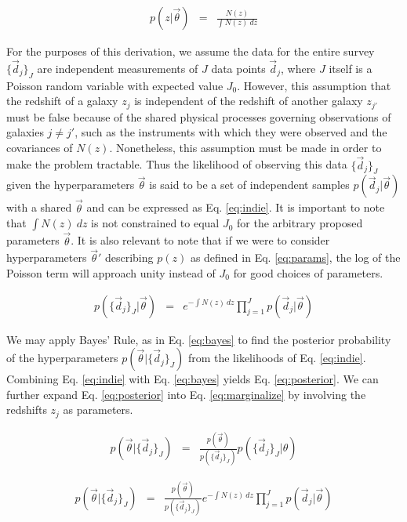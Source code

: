 \documentclass[preprint]{aastex}
\begin{document}
\begin{eqnarray}
\label{eq:params}
p(z|\vec{\theta}) &=& \frac{N(z)}{\int N(z)\ dz}
\end{eqnarray}

For the purposes of this derivation, we assume the data for the entire survey $\{\vec{d}_{j}\}_{J}$ are independent measurements of $J$ data points $\vec{d}_{j}$, where $J$ itself is a Poisson random variable with expected value $J_{0}$.  However, this assumption that the redshift of a galaxy $z_{j}$ is independent of the redshift of another galaxy $z_{j'}$ must be false because of the shared physical processes governing observations of galaxies $j\neq j'$, such as the instruments with which they were observed and the covariances of $N(z)$.  Nonetheless, this assumption must be made in order to make the problem tractable.  Thus the likelihood of observing this data $\{\vec{d}_{j}\}_{J}$ given the hyperparameters $\vec{\theta}$ is said to be a set of independent samples $p(\vec{d}_{j}|\vec{\theta})$ with a shared $\vec{\theta}$ and can be expressed as Eq. \ref{eq:indie}.  \citep{for14}  It is important to note that $\int N(z)\ dz$ is not constrained to equal $J_{0}$ for the arbitrary proposed parameters $\vec{\theta}$.  It is also relevant to note that if we were to consider hyperparameters $\vec{\theta}'$ describing $p(z)$ as defined in Eq. \ref{eq:params}, the log of the Poisson term will approach unity instead of $J_{0}$ for good choices of parameters.

\begin{eqnarray}
\label{eq:indie}
p(\{\vec{d}_{j}\}_{J}|\vec{\theta}) &=& e^{-\int N(z)\ dz}\prod_{j=1}^{J}p(\vec{d}_{j}|\vec{\theta})
\end{eqnarray}

We may apply Bayes' Rule, as in Eq. \ref{eq:bayes} to find the posterior probability of the hyperparameters $p(\vec{\theta}|\{\vec{d}_{j}\}_{J})$ from the likelihoods of Eq. \ref{eq:indie}.  Combining Eq. \ref{eq:indie} with Eq. \ref{eq:bayes} yields Eq. \ref{eq:posterior}.  We can further expand Eq. \ref{eq:posterior} into Eq. \ref{eq:marginalize} by involving the redshifts $z_{j}$ as parameters.  

\begin{eqnarray}
\label{eq:bayes}
p(\vec{\theta}|\{\vec{d}_{j}\}_{J}) &=& \frac{p(\vec{\theta})}{p(\{\vec{d}_{j}\}_{J})}p(\{\vec{d}_{j}\}_{J}|\theta)
\end{eqnarray}

\begin{eqnarray}
\label{eq:posterior}
p(\vec{\theta}|\{\vec{d}_{j}\}_{J}) &=& \frac{p(\vec{\theta})}{p(\{\vec{d}_{j}\}_{J})}e^{-\int N(z)\ dz}\prod_{j=1}^{J}p(\vec{d}_{j}|\vec{\theta})
\end{eqnarray}
\end{document}

